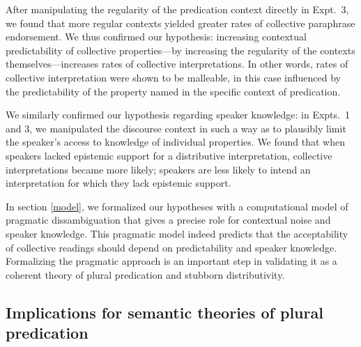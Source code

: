 \documentclass[preprint,12pt,authoryear,titlepage]{elsarticle}
\newcommand{\ndg}[1]{\textcolor{Green}{[ndg: #1]}}
\begin{document}
After manipulating the regularity of the predication context directly in Expt.~3, we found that more regular contexts yielded greater rates of collective paraphrase endorsement. We thus confirmed our hypothesis: increasing contextual predictability of collective properties---by increasing the regularity of the contexts themselves---increases rates of collective interpretations. In other words, rates of collective interpretation were shown to be malleable, in this case influenced by the predictability of the property named in the specific context of predication. 

We similarly confirmed our hypothesis regarding speaker knowledge: in Expts.~1 and 3, we manipulated the discourse context in such a way as to plausibly limit the speaker's access to knowledge of individual properties. We found that when speakers lacked epistemic support for a distributive interpretation, collective interpretations became more likely; speakers are less likely to intend an interpretation for which they lack epistemic support.

In section \ref{model}, we formalized our hypotheses with a computational model of pragmatic dissambiguation that gives a precise role for contextual noise and speaker knowledge. This pragmatic model indeed predicts that the acceptability of collective readings should depend on predictability and speaker knowledge. Formalizing the pragmatic approach is an important step in validating it as a coherent theory of plural predication and  stubborn distributivity.


\subsection{Implications for semantic theories of plural predication}


\end{document}
